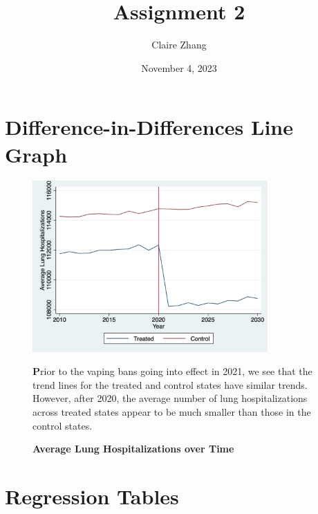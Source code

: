 \documentclass{article}
\title{Assignment 2}
\author{Claire Zhang}
\date{November 4, 2023}
\begin{document}
\maketitle

\section{Difference-in-Differences Line Graph}
\begin{figure}[htbp]

\caption{\textbf{Average Lung Hospitalizations over Time}
\label{tab:EngApproach}}
\center
	\includegraphics[width=90mm]{didlinegraph.jpg}
    \center
    \begin{footnotesize}
    \textbf Prior to the vaping bans going into effect in 2021, we see that the trend lines for the treated and control states have similar trends. However, after 2020, the average number of lung hospitalizations across treated states appear to be much smaller than those in the control states.  
    \end{footnotesize}
\end{figure}
\newpage

\section{Regression Tables}
\end{document}
